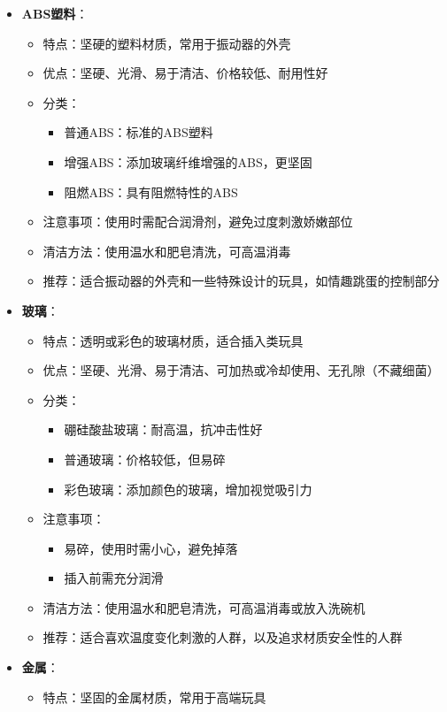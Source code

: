\documentclass[12pt,UTF8]{ctexbook}
\begin{document}
\begin{itemize}
\begin{itemize}
	\end{itemize}
	\item \textbf{ABS塑料}：
	\begin{itemize}
		\item 特点：坚硬的塑料材质，常用于振动器的外壳
		\item 优点：坚硬、光滑、易于清洁、价格较低、耐用性好
		\item 分类：
		\begin{itemize}
			\item 普通ABS：标准的ABS塑料
			\item 增强ABS：添加玻璃纤维增强的ABS，更坚固
			\item 阻燃ABS：具有阻燃特性的ABS
		\end{itemize}
		\item 注意事项：使用时需配合润滑剂，避免过度刺激娇嫩部位
		\item 清洁方法：使用温水和肥皂清洗，可高温消毒
		\item 推荐：适合振动器的外壳和一些特殊设计的玩具，如情趣跳蛋的控制部分
	\end{itemize}
	\item \textbf{玻璃}：
	\begin{itemize}
		\item 特点：透明或彩色的玻璃材质，适合插入类玩具
		\item 优点：坚硬、光滑、易于清洁、可加热或冷却使用、无孔隙（不藏细菌）
		\item 分类：
		\begin{itemize}
			\item 硼硅酸盐玻璃：耐高温，抗冲击性好
			\item 普通玻璃：价格较低，但易碎
			\item 彩色玻璃：添加颜色的玻璃，增加视觉吸引力
		\end{itemize}
		\item 注意事项：
		\begin{itemize}
			\item 易碎，使用时需小心，避免掉落
			\item 插入前需充分润滑
		\end{itemize}
		\item 清洁方法：使用温水和肥皂清洗，可高温消毒或放入洗碗机
		\item 推荐：适合喜欢温度变化刺激的人群，以及追求材质安全性的人群
	\end{itemize}
	\item \textbf{金属}：
	\begin{itemize}
		\item 特点：坚固的金属材质，常用于高端玩具

\end{itemize}
\end{itemize}
\end{document}
